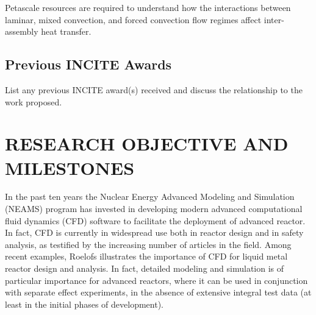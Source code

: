 \documentclass[11pt,letterpaper,english]{article}
\begin{document}
Petascale resources are required to understand how the interactions between laminar, mixed convection, and forced convection flow regimes affect inter-assembly heat transfer.

\vspace{-.25in}
\subsection{Previous INCITE Awards}
\vspace{-.2in}


List any previous INCITE award(s) received and discuss the relationship to the work proposed. 


\vspace{-.25in}
\section{RESEARCH OBJECTIVE AND MILESTONES} %
\vspace{-.2in}


In the past ten years the Nuclear Energy Advanced Modeling and Simulation (NEAMS) program \cite{sofu2017us} has invested in developing modern advanced computational fluid dynamics (CFD) software to facilitate the deployment of advanced reactor. In fact, CFD is currently in widespread use both in reactor design and in safety analysis, as testified by the increasing number of articles in the field. Among recent examples, Roelofs \cite{roelofs2018thermal} illustrates the importance of CFD for liquid metal reactor design and analysis. In fact, detailed modeling and simulation is of particular importance for advanced reactors,  where it can be used in conjunction with separate effect experiments, in the absence of extensive integral test data (at least in the initial phases of development).
\end{document}
